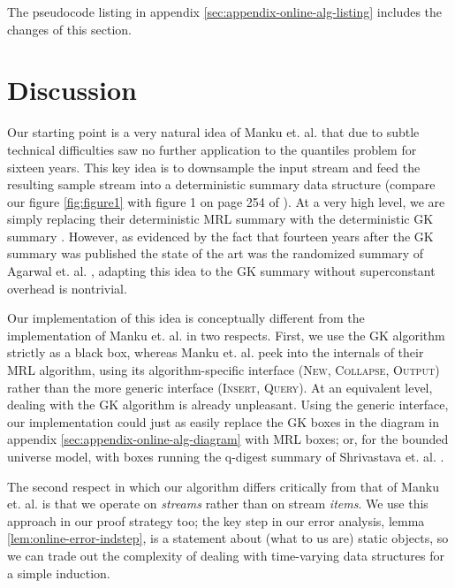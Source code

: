 \documentclass{article}
\theoremstyle{plain}
\begin{document}
The pseudocode listing in appendix \ref{sec:appendix-online-alg-listing}
includes the changes of this section.
 
\section{Discussion}
\label{sec:discussion}

Our starting point is a very natural idea of Manku et. al. \cite{MRL1999} that
due to subtle technical difficulties saw no further application to the quantiles
problem for sixteen years. This key idea is to downsample the input stream and
feed the resulting sample stream into a deterministic summary data structure
(compare our figure \ref{fig:figure1} with figure 1 on page 254 of
\cite{MRL1999}). At a very high level, we are simply replacing their
deterministic  MRL summary \cite{MRL1998} with
the deterministic  GK summary \cite{GK2001}.
However, as evidenced by the fact that fourteen years after the GK summary was
published the state of the art was the randomized  summary of Agarwal et. al. \cite{ACHPWY2012}
\cite{ACHPWY2013}, adapting this idea to the GK summary without superconstant
overhead is nontrivial.

Our implementation of this idea is conceptually different from the
implementation of Manku et. al. in two respects. First, we use the GK algorithm
strictly as a black box, whereas Manku et. al. peek into the internals of their
MRL algorithm, using its algorithm-specific interface (\textsc{New},
\textsc{Collapse}, \textsc{Output}) rather than the more generic interface
(\textsc{Insert}, \textsc{Query}). At an equivalent level, dealing with the GK
algorithm is already unpleasant. Using the generic interface, our implementation
could just as easily replace the GK boxes in the diagram in appendix
\ref{sec:appendix-online-alg-diagram} with MRL boxes; or, for the bounded
universe model, with boxes running the q-digest summary of Shrivastava et. al.
\cite{SBAS2004}.

The second respect in which our algorithm differs critically from that of Manku
et. al. is that we operate on \emph{streams} rather than on stream \emph{items}.
We use this approach in our proof strategy too; the key step in our error
analysis, lemma \ref{lem:online-error-indstep}, is a statement about (what to us
are) static objects, so we can trade out the complexity of dealing with
time-varying data structures for a simple induction.
\end{document}
